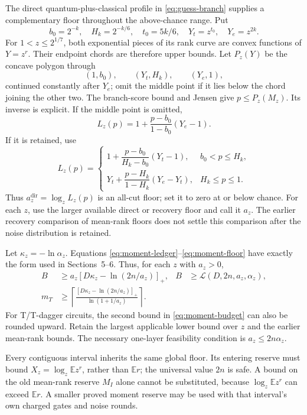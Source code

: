 \documentclass[11pt,a4paper]{article}
\numberwithin{equation}{section}
\theoremstyle{remark}\newtheorem*{remark}{Interpretation}
\newcommand{\E}{\mathbb E}
\begin{document}
The direct quantum-plus-classical profile in \eqref{eq:guess-branch} supplies a complementary floor throughout the above-chance range. Put
\[
b_0=2^{-k},\quad H_k=2^{-k/6},\quad t_0=5k/6,\quad
Y_t=z^{t_0},\quad Y_e=z^{2k}.
\]
For $1<z\le2^{1/7}$, both exponential pieces of its rank curve are convex functions of $Y=z^r$. Their endpoint chords are therefore upper bounds. Let $P_z(Y)$ be the concave polygon through
\[
(1,b_0),\qquad(Y_t,H_k),\qquad(Y_e,1),
\]
continued constantly after $Y_e$; omit the middle point if it lies below the chord joining the other two. The branch-score bound and Jensen give $p\le P_z(M_z)$. Its inverse is explicit. If the middle point is omitted,
\[
L_z(p)=1+\frac{p-b_0}{1-b_0}(Y_e-1).
\]
If it is retained, use
\begin{equation}
L_z(p)=
\begin{cases}
1+\dfrac{p-b_0}{H_k-b_0}(Y_t-1),&b_0<p\le H_k,\\[5pt]
Y_t+\dfrac{p-H_k}{1-H_k}(Y_e-Y_t),&H_k\le p\le1.
\end{cases}
\label{eq:moment-direct-inverse}
\end{equation}
Thus $a_z^{\mathrm{dir}}=\log_zL_z(p)$ is an all-cut floor; set it to zero at or below chance. For each $z$, use the larger available direct or recovery floor and call it $a_z$. The earlier recovery comparison of mean-rank floors does not settle this comparison after the noise distribution is retained.

Let $\kappa_z=-\ln\alpha_z$. Equations \eqref{eq:moment-ledger}--\eqref{eq:moment-floor} have exactly the form used in Sections~5--6. Thus, for each $z$ with $a_z>0$,
\begin{align}
B&\ge a_z[D\kappa_z-\ln(2n/a_z)]_+,
& B&\ge\mathcal L(D,2n,a_z,\alpha_z),\label{eq:moment-budget}\\
m_T&\ge\left\lceil
\frac{[D\kappa_z-\ln(2n/a_z)]_+}{\ln(1+1/a_z)}
\right\rceil .\label{eq:moment-integer}
\end{align}
For T/T-dagger circuits, the second bound in \eqref{eq:moment-budget} can also be rounded upward. Retain the largest applicable lower bound over $z$ and the earlier mean-rank bounds. The necessary one-layer feasibility condition is $a_z\le2n\alpha_z$.

Every contiguous interval inherits the same global floor. Its entering reserve must bound $X_z=\log_z\E z^r$, rather than $\E r$; the universal value $2n$ is safe. A bound on the old mean-rank reserve $M_I$ alone cannot be substituted, because $\log_z\E z^r$ can exceed $\E r$. A smaller proved moment reserve may be used with that interval's own charged gates and noise rounds.
\end{document}

